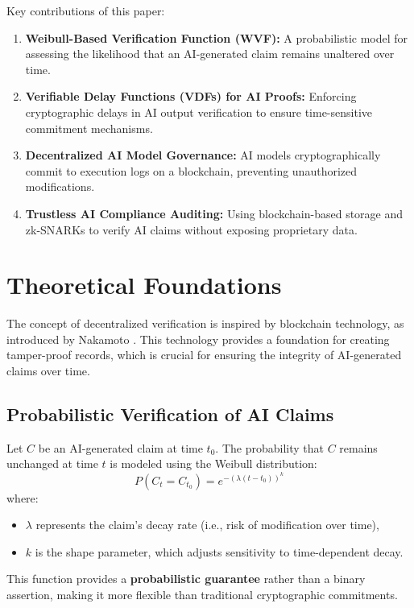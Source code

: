 \documentclass[12pt]{report}
\begin{document}
Key contributions of this paper:
\begin{enumerate}
    \item \textbf{Weibull-Based Verification Function (WVF):} A probabilistic model for assessing the likelihood that an AI-generated claim remains unaltered over time.
    \item \textbf{Verifiable Delay Functions (VDFs) for AI Proofs:} Enforcing cryptographic delays in AI output verification to ensure time-sensitive commitment mechanisms.
    \item \textbf{Decentralized AI Model Governance:} AI models cryptographically commit to execution logs on a blockchain, preventing unauthorized modifications.
    \item \textbf{Trustless AI Compliance Auditing:} Using blockchain-based storage and zk-SNARKs to verify AI claims without exposing proprietary data.
\end{enumerate}

\section{Theoretical Foundations}

The concept of decentralized verification is inspired by blockchain technology, as introduced by Nakamoto \cite{nakamoto2008}. This technology provides a foundation for creating tamper-proof records, which is crucial for ensuring the integrity of AI-generated claims over time.

\subsection{Probabilistic Verification of AI Claims}

Let \( C \) be an AI-generated claim at time \( t_0 \). The probability that \( C \) remains unchanged at time \( t \) is modeled using the Weibull distribution:
\[
P(C_t = C_{t_0}) = e^{-(\lambda (t - t_0))^k}
\]
where:
\begin{itemize}
    \item \( \lambda \) represents the claim's decay rate (i.e., risk of modification over time),
    \item \( k \) is the shape parameter, which adjusts sensitivity to time-dependent decay.
\end{itemize}
This function provides a \textbf{probabilistic guarantee} rather than a binary assertion, making it more flexible than traditional cryptographic commitments.
\end{document}
